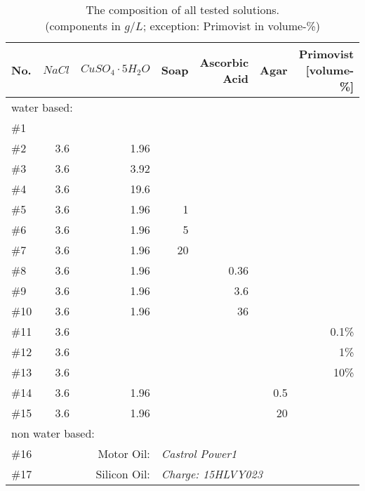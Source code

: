 \begin{table}[!hbt]
\centering
\caption[The composition of all tested solutions.]{The composition of all tested solutions.\\(components in $g/L$; exception: Primovist in volume-\%)}
\begin{tabular}{@{}l|rrrrrr@{}}
No.   & $NaCl$   & $CuSO_4\cdot5H_2O$          & Soap & Ascorbic Acid & Agar & Primovist [volume-\%]\\
\toprule
\multicolumn{3}{l}{water based:} \\
\#1  &             &                   &      &               &           &		\\
\#2  & 3.6         & 1.96              &      &               &           &		\\
\#3  & 3.6         & 3.92              &      &               &           &		\\
\#4  & 3.6         & 19.6              &      &               &           &		\\
\#5  & 3.6         & 1.96              & 1    &               &           &		\\
\#6  & 3.6         & 1.96              & 5    &               &           &		\\
\#7  & 3.6         & 1.96              & 20   &               &           &		\\
\#8  & 3.6         & 1.96              &      & 0.36          &           &		\\
\#9  & 3.6         & 1.96              &      & 3.6           &           &		\\
\#10 & 3.6         & 1.96              &      & 36            &           &		\\
\#11 & 3.6         &                   &      &               &           & 0.1\%	\\
\#12 & 3.6         &                   &      &               &           & 1\%		\\
\#13 & 3.6         &                   &      &               &           & 10\%	\\
\#14 & 3.6         & 1.96              &      &               &  0.5      &		\\
\#15 & 3.6         & 1.96              &      &               &   20      &		\\
\midrule
\multicolumn{3}{l}{non water based:} \\
\#16 & \multicolumn{2}{r}{Motor Oil:}   & \multicolumn{4}{l}{\textit{Castrol Power1}}      \\
\#17 & \multicolumn{2}{r}{Silicon Oil:} & \multicolumn{4}{l}{\textit{Charge: 15HLVY023}}
\end{tabular}
\label{tab:solutions}
\end{table}


